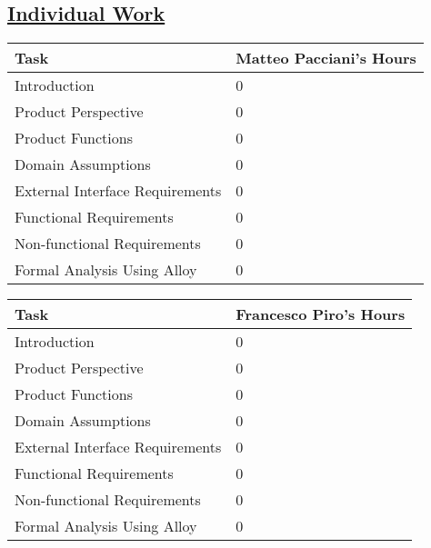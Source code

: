 \subsection[Individual Work]{\hyperlink{toc}{Individual Work}}
\vspace{2mm}
\begin{center}
	\begin{tabular}{| l | p{} |}
	\hline
	\textbf{Task} & \textbf{Matteo Pacciani's Hours} \\ \hline
	Introduction & 0 \\ \hline
	Product Perspective & 0 \\ \hline
	Product Functions & 0 \\ \hline
	Domain Assumptions & 0 \\ \hline
	External Interface Requirements & 0 \\ \hline
	Functional Requirements & 0 \\ \hline
	Non-functional Requirements & 0 \\ \hline
	Formal Analysis Using Alloy & 0 \\
	\hline	
	\end{tabular}
	
	\vspace{2mm}
	
	\begin{tabular}{| l | p{} |}
	\hline
	\textbf{Task} & \textbf{Francesco Piro's Hours} \\ \hline
	Introduction & 0 \\ \hline
	Product Perspective & 0 \\ \hline
	Product Functions & 0 \\ \hline
	Domain Assumptions & 0 \\ \hline
	External Interface Requirements & 0 \\ \hline
	Functional Requirements & 0 \\ \hline
	Non-functional Requirements & 0 \\ \hline
	Formal Analysis Using Alloy & 0 \\
	\hline	
	\end{tabular}
\end{center}